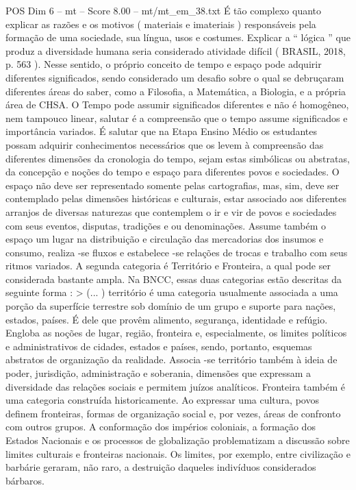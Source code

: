 \begin{textsample}{POS Dim 6 – mt – Score 8.00 – mt/mt\_em\_38.txt}
É tão complexo quanto explicar as razões e os motivos ( materiais e imateriais ) responsáveis pela formação de uma sociedade, sua língua, usos e costumes.
Explicar a “ lógica ” que produz a diversidade humana seria considerado atividade difícil ( BRASIL, 2018, p. 563 ).
Nesse sentido, o próprio conceito de tempo e espaço pode adquirir diferentes significados, sendo considerado um desafio sobre o qual se debruçaram diferentes áreas do saber, como a Filosofia, a Matemática, a Biologia, e a própria área de CHSA.
O Tempo pode assumir significados diferentes e não é homogêneo, nem tampouco linear, salutar é a compreensão que o tempo assume significados e importância variados.
É salutar que na Etapa Ensino Médio os estudantes possam adquirir conhecimentos necessários que os levem à compreensão das diferentes dimensões da cronologia do tempo, sejam estas simbólicas ou abstratas, da concepção e noções do tempo e espaço para diferentes povos e sociedades.
O espaço não deve ser representado somente pelas cartografias, mas, sim, deve ser contemplado pelas dimensões históricas e culturais, estar associado aos diferentes arranjos de diversas naturezas que contemplem o ir e vir de povos e sociedades com seus eventos, disputas, tradições e ou denominações.
Assume também o espaço um lugar na distribuição e circulação das mercadorias dos insumos e consumo, realiza -se fluxos e estabelece -se relações de trocas e trabalho com seus ritmos variados.
A segunda categoria é Território e Fronteira, a qual pode ser considerada bastante ampla.
Na BNCC, essas duas categorias estão descritas da seguinte forma : > (... ) território é uma categoria usualmente associada a uma porção da superfície terrestre sob domínio de um grupo e suporte para nações, estados, países.
É dele que provêm alimento, segurança, identidade e refúgio.
Engloba as noções de lugar, região, fronteira e, especialmente, os limites políticos e administrativos de cidades, estados e países, sendo, portanto, esquemas abstratos de organização da realidade.
Associa -se território também à ideia de poder, jurisdição, administração e soberania, dimensões que expressam a diversidade das relações sociais e permitem juízos analíticos.
Fronteira também é uma categoria construída historicamente.
Ao expressar uma cultura, povos definem fronteiras, formas de organização social e, por vezes, áreas de confronto com outros grupos.
A conformação dos impérios coloniais, a formação dos Estados Nacionais e os processos de globalização problematizam a discussão sobre limites culturais e fronteiras nacionais.
Os limites, por exemplo, entre civilização e barbárie geraram, não raro, a destruição daqueles indivíduos considerados bárbaros.

\end{textsample}
